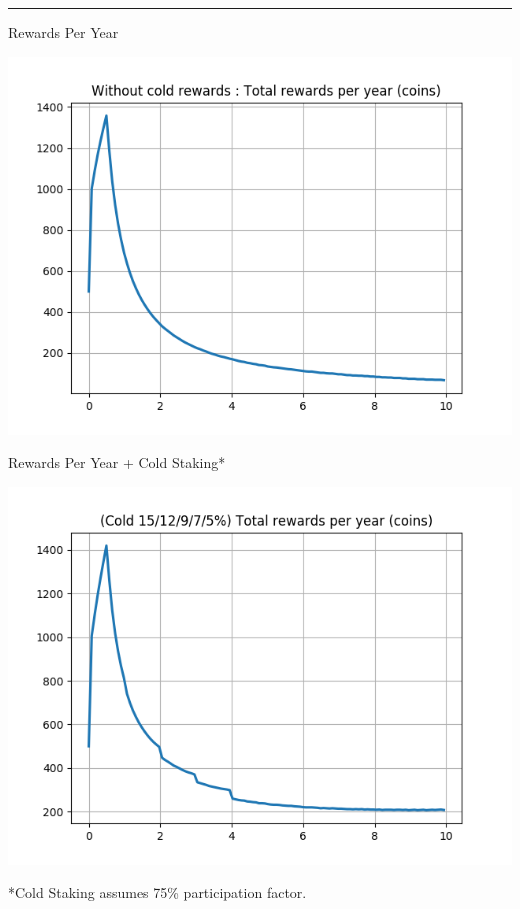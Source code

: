 {}

\begin{center}\rule{0.5\linewidth}{\linethickness}\end{center}

{}

{Rewards Per Year}

{\includegraphics{images/image4.png}}

{Rewards Per Year + Cold Staking*}

{\includegraphics{images/image3.png}}

{}

{*Cold Staking assumes 75\% participation factor.}

{}


